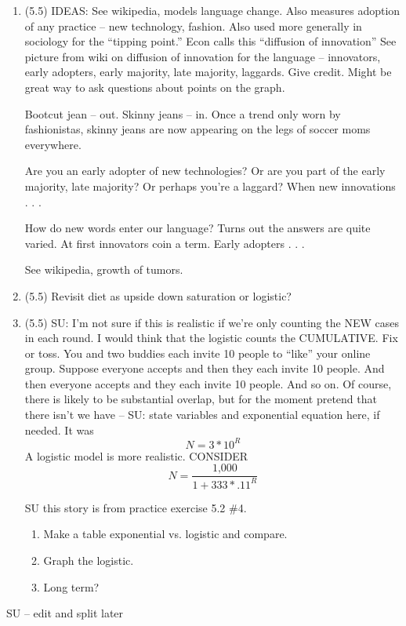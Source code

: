 \documentclass[12pt]{article}
\begin{document}
\begin{enumerate}
\item (5.5) IDEAS:  See wikipedia, models language change.  Also measures adoption of any practice -- new technology, fashion.  Also used more generally in sociology for the ``tipping point.''  Econ calls this ``diffusion of innovation''  See picture from wiki on diffusion of innovation for the language -- innovators, early adopters, early majority, late majority, laggards.  Give credit.  Might be great way to ask questions about points on the graph.

 Bootcut jean -- out.  Skinny jeans -- in.  Once a trend only worn by fashionistas, skinny jeans are now appearing on the legs of soccer moms everywhere.  

Are you an early adopter of new technologies?  Or are you part of the early majority, late majority?  Or perhaps you're a laggard?  When new innovations . . .

How do new words enter our language?  Turns out the answers are quite varied.  At first innovators coin a term.  Early adopters . . .

See wikipedia, growth of tumors.


\item (5.5)  Revisit diet as upside down saturation or logistic?

\item (5.5) SU:  I'm not sure if this is realistic if we're only counting the NEW cases in each round.  I would think that the logistic counts the CUMULATIVE.  Fix or toss. You and two buddies each invite 10 people to ``like'' your online group.  Suppose everyone accepts and then they each invite 10 people.  And then everyone accepts and they each invite 10 people.  And so on. Of course, there is likely to be substantial overlap, but for the moment pretend that there isn't we have -- SU:  state variables and exponential equation here, if needed.  It was $$N=3 \ast 10^R$$
A logistic model is more realistic.  CONSIDER $$ N = \frac{\text{1,000}}{1+333 \ast .11^R}$$

SU this story is from practice exercise 5.2 \#4.
\begin{enumerate}
\item Make a table exponential vs. logistic and compare.
\item Graph the logistic.
\item Long term?
\end{enumerate} 

\end{enumerate}

SU -- edit and split later
\end{document}
